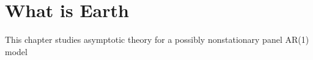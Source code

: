 \chapter{What is Earth} \label{chp1}

This chapter studies asymptotic theory for a possibly nonstationary panel AR(1) model 